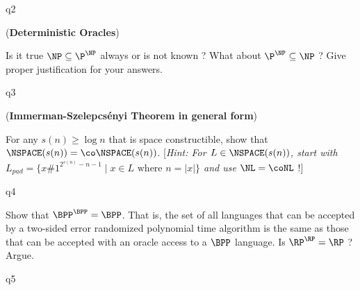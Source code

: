 \documentclass[12pt, a4paper,answers]{exam}
\begin{document}
\begin{questions}
\begin{solution}
    {q2}
\end{solution}

\question[5] (\textbf{Deterministic Oracles}) 

Is it true $\NP \subseteq \P^{\NP}$ always or is not known ?  What about $\P^{\NP} \subseteq \NP$ ? Give proper justification for your answers.

\begin{solution}
    {q3}
\end{solution}

\question[5] (\textbf{Immerman-Szelepcs\'enyi Theorem in general form}) 

For any $s(n) \ge \log n$ that is space constructible, show that $\NSPACE(s(n)) = \co\NSPACE(s(n))$. [\textit{Hint: For $L \in \NSPACE(s(n))$, start with $L_{pad} = \{x \# 1^{2^{s(n)}-n-1} \mid x \in L\text{ where } n=|x|\}$  and use $\NL=\coNL$} !] 

\begin{solution}
    {q4}
\end{solution}


\question[15] Show that $\BPP^\BPP = \BPP$. That is, the set of all languages that can be accepted by a two-sided error randomized polynomial time  algorithm is the same as those that can be accepted with an oracle access to a $\BPP$ language. Is $\RP^\RP = \RP$ ? Argue.

\begin{solution}
    {q5}
\end{solution}


\end{questions}
\end{document}
